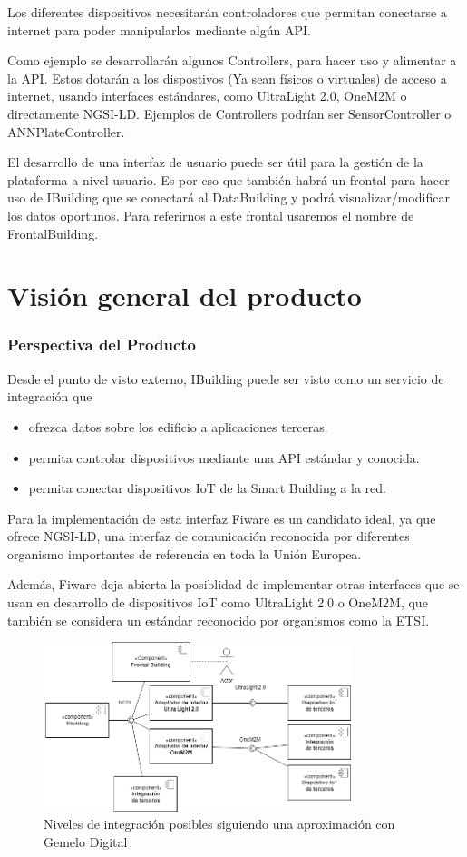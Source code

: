 \documentclass[12pt, a4paper, twoside]{article}
\begin{document}
Los diferentes dispositivos necesitarán controladores que permitan conectarse
a internet para poder manipularlos mediante algún API.

Como ejemplo se desarrollarán algunos Controllers, para hacer uso y alimentar a la API.
Estos dotarán a los dispostivos (Ya sean físicos o virtuales) de acceso a internet, usando interfaces 
estándares, como UltraLight 2.0, OneM2M o directamente NGSI-LD. Ejemplos de Controllers podrían
ser SensorController o ANNPlateController.

El desarrollo de una interfaz de usuario puede ser útil para la gestión de la plataforma
a nivel usuario. Es por eso que también habrá un frontal para hacer uso de IBuilding
que se conectará al DataBuilding y podrá visualizar/modificar los datos oportunos.
Para referirnos a este frontal usaremos el nombre de FrontalBuilding.

\section{Visión general del producto}
\subsubsection{Perspectiva del Producto}
Desde el punto de visto externo, IBuilding puede ser visto como un servicio de integración que
\begin{itemize}
  \item ofrezca datos sobre los edificio a aplicaciones terceras.
  \item permita controlar dispositivos mediante una API estándar y conocida.
  \item permita conectar dispositivos IoT de la Smart Building a la red.
\end{itemize}

Para la implementación de esta interfaz Fiware es un candidato ideal, ya que ofrece NGSI-LD,
una interfaz de comunicación reconocida por diferentes organismo importantes de referencia en toda la Unión Europea.

Además, Fiware deja abierta la posiblidad de implementar otras interfaces que se usan en desarrollo de dispositivos
IoT como UltraLight 2.0 o OneM2M, que también se considera un estándar reconocido por organismos
como la ETSI.

\begin{figure}[h]
  \centering
  \includegraphics[width=0.8\textwidth]{IBuildingGenericComponents.1.1.png}
  \caption{Niveles de integración posibles siguiendo una aproximación con Gemelo Digital}
\end{figure}
\end{document}

